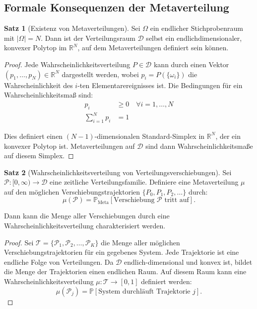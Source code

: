 ﻿\documentclass[a4paper,12pt]{article}
\theoremstyle{definition}
\newtheorem{satz}{Satz}
\begin{document}
\subsection{Formale Konsequenzen der Metaverteilung}

\begin{satz}[Existenz von Metaverteilungen]
\label{satz:existenz-metaverteilung}
Sei $\Omega$ ein endlicher Stichprobenraum mit $|\Omega| = N$. Dann ist der Verteilungsraum $\mathcal{D}$ selbst ein endlichdimensionaler, konvexer Polytop im $\mathbb{R}^N$, auf dem Metaverteilungen definiert sein können.
\end{satz}

\begin{proof}
Jede Wahrscheinlichkeitsverteilung $P \in \mathcal{D}$ kann durch einen Vektor $(p_1, \ldots, p_N) \in \mathbb{R}^N$ dargestellt werden, wobei $p_i = P(\{\omega_i\})$ die Wahrscheinlichkeit des $i$-ten Elementarereignisses ist. Die Bedingungen für ein Wahrscheinlichkeitsmaß sind:
\begin{align}
p_i &\geq 0 \quad \forall i = 1, \ldots, N \\
\sum_{i=1}^N p_i &= 1
\end{align}

Dies definiert einen $(N-1)$-dimensionalen Standard-Simplex in $\mathbb{R}^N$, der ein konvexer Polytop ist. Metaverteilungen auf $\mathcal{D}$ sind dann Wahrscheinlichkeitsmaße auf diesem Simplex.
\end{proof}

\begin{satz}[Wahrscheinlichkeitsverteilung von Verteilungsverschiebungen]
\label{satz:verteilungsverschiebung}
Sei $\mathcal{P}: [0, \infty) \to \mathcal{D}$ eine zeitliche Verteilungsfamilie. Definiere eine Metaverteilung $\mu$ auf den möglichen Verschiebungstrajektorien $\{P_0, P_1, P_2, \ldots\}$ durch:
\[
\mu(\mathcal{P}) = \mathbb{P}_{\text{Meta}}\left[ \text{Verschiebung } \mathcal{P} \text{ tritt auf} \right].
\]

Dann kann die Menge aller Verschiebungen durch eine Wahrscheinlichkeitsverteilung charakterisiert werden.
\end{satz}

\begin{proof}
Sei $\mathcal{T} = \{\mathcal{P}_1, \mathcal{P}_2, \ldots, \mathcal{P}_K\}$ die Menge aller möglichen Verschiebungstrajektorien für ein gegebenes System. Jede Trajektorie ist eine endliche Folge von Verteilungen. Da $\mathcal{D}$ endlich-dimensional und konvex ist, bildet die Menge der Trajektorien einen endlichen Raum. Auf diesem Raum kann eine Wahrscheinlichkeitsverteilung $\mu: \mathcal{T} \to [0,1]$ definiert werden:
\[
\mu(\mathcal{P}_j) = \mathbb{P}\left[ \text{System durchläuft Trajektorie } j \right].
\]
\end{proof}
\end{document}
